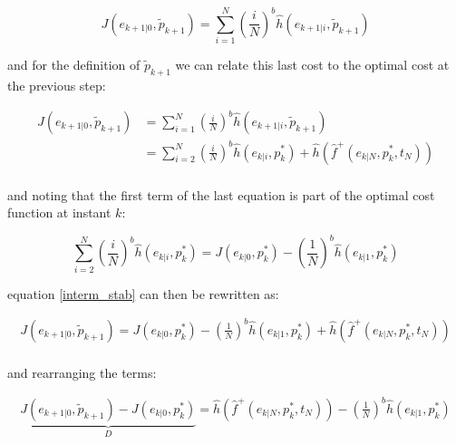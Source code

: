\documentclass[12pt]{article}
\begin{document}
\begin{equation}
	J({e}_{k+1|0},\tilde{p}_{k+1})=\sum_{i=1}^{N}\left(\frac{i}{N}\right)^b\hat{h}(e_{k+1|i},\tilde{p}_{k+1})
\end{equation}

and for the definition of $\tilde{p}_{k+1}$ we can relate this last cost to the optimal cost at the previous step: 


\begin{equation}
\begin{split}
	J({e}_{k+1|0},\tilde{p}_{k+1})&=\sum_{i=1}^{N}\left(\frac{i}{N}\right)^b\hat{h}(e_{k+1|i},\tilde{p}_{k+1}) \\
	&=\sum_{i=2}^{N}\left(\frac{i}{N}\right)^b\hat{h}(e_{k|i},p^*_{k}) + \hat{h}(\hat{f}^+(e_{k|N},p^*_k,t_N)) \\
\end{split}
\label{interm_stab}
\end{equation}

and noting that the first term of the last equation is part of the optimal cost function at instant $k$:

\begin{equation}
	\sum_{i=2}^{N}\left(\frac{i}{N}\right)^b\hat{h}(e_{k|i},p^*_{k})=J({e}_{k|0},p^*_k) -\left( \frac{1}{N} \right)^b\hat{h}(e_{k|1},p^*_{k})
\end{equation}

equation \ref{interm_stab} can then be rewritten as:

\begin{equation}
\begin{split}
	J({e}_{k+1|0},\tilde{p}_{k+1})=J({e}_{k|0},p^*_k) -\left( \frac{1}{N} \right)^b\hat{h}(e_{k|1},p^*_{k}) + \hat{h}(\hat{f}^+(e_{k|N},p^*_k,t_N)) \\
\end{split}
\end{equation}

and rearranging the terms:

\begin{equation}
\begin{split}
	\underbrace{J({e}_{k+1|0},\tilde{p}_{k+1})-J({e}_{k|0},p^*_k)}_{D}= \hat{h}(\hat{f}^+(e_{k|N},p^*_k,t_N)) -\left( \frac{1}{N} \right)^b\hat{h}(e_{k|1},p^*_{k}) \\
\end{split}
\end{equation}
\end{document}

